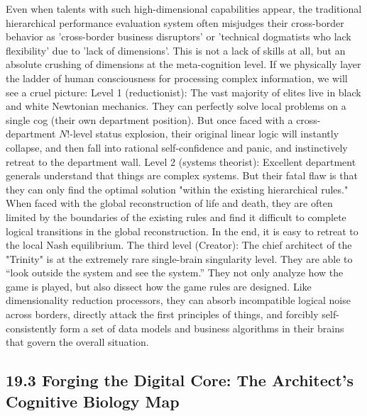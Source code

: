 \documentclass[11pt,a4paper]{article}
\begin{document}
Even when talents with such high-dimensional capabilities appear, the traditional hierarchical performance evaluation system often misjudges their cross-border behavior as 'cross-border business disruptors' or 'technical dogmatists who lack flexibility' due to 'lack of dimensions'. This is not a lack of skills at all, but an absolute crushing of dimensions at the meta-cognition level. If we physically layer the ladder of human consciousness for processing complex information, we will see a cruel picture: Level 1 (reductionist): The vast majority of elites live in black and white Newtonian mechanics. They can perfectly solve local problems on a single cog (their own department position). But once faced with a cross-department $N!$-level status explosion, their original linear logic will instantly collapse, and then fall into rational self-confidence and panic, and instinctively retreat to the department wall. Level 2 (systems theorist): Excellent department generals understand that things are complex systems. But their fatal flaw is that they can only find the optimal solution "within the existing hierarchical rules." When faced with the global reconstruction of life and death, they are often limited by the boundaries of the existing rules and find it difficult to complete logical transitions in the global reconstruction. In the end, it is easy to retreat to the local Nash equilibrium. The third level (Creator): The chief architect of the "Trinity" is at the extremely rare single-brain singularity level. They are able to “look outside the system and see the system.” They not only analyze how the game is played, but also dissect how the game rules are designed. Like dimensionality reduction processors, they can absorb incompatible logical noise across borders, directly attack the first principles of things, and forcibly self-consistently form a set of data models and business algorithms in their brains that govern the overall situation.


\subsection*{19.3 Forging the Digital Core: The Architect’s Cognitive Biology Map}
\end{document}
